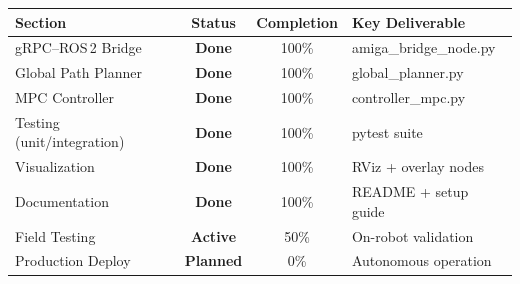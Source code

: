 \documentclass[a4paper,11pt]{article}
\begin{document}
\begin{center}
\renewcommand{\arraystretch}{1.3}
\begin{tabular}{|l|c|c|l|}
\hline
\textbf{Section} & \textbf{Status} & \textbf{Completion} & \textbf{Key Deliverable} \\
\hline
gRPC--ROS\,2 Bridge      & \textcolor{done}{\textbf{Done}}      & 100\% & amiga\_bridge\_node.py \\
Global Path Planner       & \textcolor{done}{\textbf{Done}}      & 100\% & global\_planner.py \\
MPC Controller            & \textcolor{done}{\textbf{Done}}      & 100\% & controller\_mpc.py \\
Testing (unit/integration)& \textcolor{done}{\textbf{Done}}      & 100\% & pytest suite \\
Visualization             & \textcolor{done}{\textbf{Done}}      & 100\% & RViz + overlay nodes \\
Documentation             & \textcolor{done}{\textbf{Done}}      & 100\% & README + setup guide \\
Field Testing             & \textcolor{inprog}{\textbf{Active}}  &  50\% & On-robot validation \\
Production Deploy         & \textcolor{planned}{\textbf{Planned}} &   0\% & Autonomous operation \\
\hline
\end{tabular}
\end{center}
\end{document}
